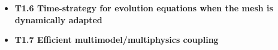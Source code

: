 \begin{itemize}
    \item {\bf T1.6 Time-strategy for evolution equations when the mesh is dynamically adapted}\\
    \item {\bf T1.7 Efficient multimodel/multiphysics coupling}\\

\end{itemize}
